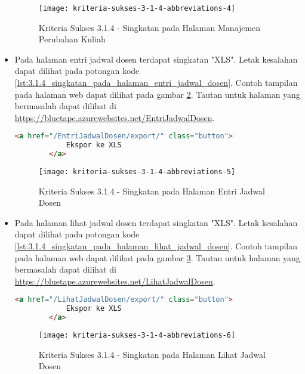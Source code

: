 \begin{itemize}
    \begin{figure}[H]
        \centering  
        \texttt{[image: kriteria-sukses-3-1-4-abbreviations-4]}  
        \caption[Kriteria Sukses 3.1.4 - Singkatan pada Halaman Manajemen Perubahan Kuliah]{Kriteria Sukses 3.1.4 - Singkatan pada Halaman Manajemen Perubahan Kuliah}
        \label{fig:3.1.4_abbreviations_4}  
    \end{figure}
    
    \item Pada halaman entri jadwal dosen terdapat singkatan "XLS". Letak kesalahan dapat dilihat pada potongan kode \ref{lst:3.1.4_singkatan_pada_halaman_entri_jadwal_dosen}. Contoh tampilan pada halaman web dapat dilihat pada gambar \ref{fig:3.1.4_abbreviations_5}. Tautan untuk halaman yang bermasalah dapat dilihat di \url{https://bluetape.azurewebsites.net/EntriJadwalDosen}.
    \begin{lstlisting}[frame=single, label={lst:3.1.4_singkatan_pada_halaman_entri_jadwal_dosen}, language=HTML, caption=Kriteria Sukses 3.1.4 - Singkatan pada Halaman Entri Jadwal Dosen]
        <a href="/EntriJadwalDosen/export/" class="button">
            Ekspor ke XLS
        </a>
    \end{lstlisting}

    \begin{figure}[H]
        \centering  
        \texttt{[image: kriteria-sukses-3-1-4-abbreviations-5]}  
        \caption[Kriteria Sukses 3.1.4 - Singkatan pada Halaman Entri Jadwal Dosen]{Kriteria Sukses 3.1.4 - Singkatan pada Halaman Entri Jadwal Dosen}
        \label{fig:3.1.4_abbreviations_5}  
    \end{figure}
    
    \item Pada halaman lihat jadwal dosen terdapat singkatan "XLS". Letak kesalahan dapat dilihat pada potongan kode \ref{lst:3.1.4_singkatan_pada_halaman_lihat_jadwal_dosen}. Contoh tampilan pada halaman web dapat dilihat pada gambar \ref{fig:3.1.4_abbreviations_6}. Tautan untuk halaman yang bermasalah dapat dilihat di \url{https://bluetape.azurewebsites.net/LihatJadwalDosen}.
    \begin{lstlisting}[frame=single, label={lst:3.1.4_singkatan_pada_halaman_lihat_jadwal_dosen}, language=HTML, caption=Kriteria Sukses 3.1.4 - Singkatan pada Halaman Lihat Jadwal Dosen]
        <a href="/LihatJadwalDosen/export/" class="button">
            Ekspor ke XLS
        </a>
    \end{lstlisting}

    \begin{figure}[H]
        \centering  
        \texttt{[image: kriteria-sukses-3-1-4-abbreviations-6]}  
        \caption[Kriteria Sukses 3.1.4 - Singkatan pada Halaman Lihat Jadwal Dosen]{Kriteria Sukses 3.1.4 - Singkatan pada Halaman Lihat Jadwal Dosen}
        \label{fig:3.1.4_abbreviations_6}  
    \end{figure}
\end{itemize}


